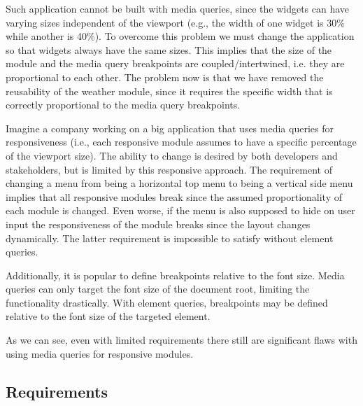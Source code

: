 \documentclass{acm_proc_article-sp}
\begin{document}
    Such application cannot be built with media queries, since the widgets can have varying sizes independent of the viewport (e.g., the width of one widget is 30\% while another is 40\%).
    To overcome this problem we must change the application so that widgets always have the same sizes.
    This implies that the size of the module and the media query breakpoints are coupled/intertwined, i.e. they are proportional to each other.
    The problem now is that we have removed the reusability of the weather module, since it requires the specific width that is correctly proportional to the media query breakpoints. 

    Imagine a company working on a big application that uses media queries for responsiveness (i.e., each responsive module assumes to have a specific percentage of the viewport size).
    The ability to change is desired by both developers and stakeholders, but is limited by this responsive approach.
    The requirement of changing a menu from being a horizontal top menu to being a vertical side menu implies that all responsive modules break since the assumed proportionality of each module is changed.
    Even worse, if the menu is also supposed to hide on user input the responsiveness of the module breaks since the layout changes dynamically.
    The latter requirement is impossible to satisfy without element queries.

    Additionally, it is popular to define breakpoints relative to the font size.
    Media queries can only target the font size of the document root, limiting the functionality drastically.
    With element queries, breakpoints may be defined relative to the font size of the targeted element.

    As we can see, even with limited requirements there still are significant flaws with using media queries for responsive modules.

    \label{sec:reqs}
    \subsection{Requirements}
\end{document}
